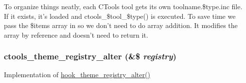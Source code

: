 To organize things neatly, each CTools tool gets its own toolname.\$type.inc file. If it exists, it's loaded and ctools\_\-\$tool\_\-\$type() is executed. To save time we pass the \$items array in so we don't need to do array addition. It modifies the array by reference and doesn't need to return it. \hypertarget{profiles_2dosomething_2modules_2contrib_2ctools_2includes_2utility_8inc_a556bd4f6f591e705590138bc3d756291}{
\subsubsection[{ctools\_\-theme\_\-registry\_\-alter}]{\setlength{\rightskip}{0pt plus 5cm}ctools\_\-theme\_\-registry\_\-alter (\&\$ {\em registry})}}
\label{profiles_2dosomething_2modules_2contrib_2ctools_2includes_2utility_8inc_a556bd4f6f591e705590138bc3d756291}
Implementation of \hyperlink{group__hooks_gadd6cabb9ce825efccefb4918321932a5}{hook\_\-theme\_\-registry\_\-alter()} 